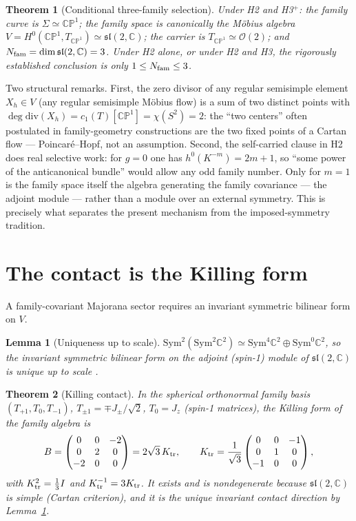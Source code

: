 \documentclass[
  aps,prd,superscriptaddress,nofootinbib,preprint
]{revtex4-2}
\newtheorem{theorem}{Theorem}
\newtheorem{lemma}{Lemma}
\theoremstyle{remark}
\newcommand{\CP}{\mathbb{CP}}
\newcommand{\cO}{\mathcal{O}}
\newcommand{\sltwo}{\mathfrak{sl}(2,\mathbb C)}
\newcommand{\Ktr}{K_{\rm tr}}
\begin{document}
\begin{theorem}[Conditional three-family selection]
\label{thm:threefam}
Under H2 and H3$^+$: the family curve is $\Sigma\simeq\CP^1$; the
family space is canonically the M\"obius algebra
$V=H^0(\CP^1,T_{\CP^1})\simeq\sltwo$; the carrier is
$T_{\CP^1}\simeq\cO(2)$; and $N_{\rm fam}=\dim\sltwo=3$.
Under H2 alone, or under H2 and H3, the rigorously established conclusion
is only $1\le N_{\rm fam}\le3$.
\end{theorem}

Two structural remarks.  First, the zero divisor of any regular
semisimple element $X_h\in V$ (any regular semisimple M\"obius flow) is a sum of two
distinct points with
$\deg\mathrm{div}(X_h)=c_1(T)[\CP^1]=\chi(S^2)=2$: the ``two centers''
often postulated in family-geometry constructions are the two fixed
points of a Cartan flow --- Poincar\'e--Hopf, not an assumption.
Second, the self-carried clause in H2 does real selective work: for
$g=0$ one has $h^0(K^{-m})=2m+1$, so ``some power of the anticanonical
bundle'' would allow any odd family number.  Only for $m=1$ is the
family space itself the algebra generating the family covariance ---
the adjoint module --- rather than a module over an external symmetry.
This is precisely what separates the present mechanism from the
imposed-symmetry tradition.

\section{The contact is the Killing form}
\label{sec:killing}

A family-covariant Majorana sector requires an invariant symmetric
bilinear form on $V$.

\begin{lemma}[Uniqueness up to scale]
\label{lem:unique}
$\mathrm{Sym}^2(\mathrm{Sym}^2\mathbb C^2)\simeq
\mathrm{Sym}^4\mathbb C^2\oplus\mathrm{Sym}^0\mathbb C^2$, so the
invariant symmetric bilinear form on the adjoint (spin-1) module of
$\sltwo$ is unique up to scale \cite{FultonHarris1991}.
\end{lemma}

\begin{theorem}[Killing contact]
\label{thm:killing}
In the spherical orthonormal family basis $(T_{+1},T_0,T_{-1})$,
$T_{\pm1}=\mp J_\pm/\sqrt2$, $T_0=J_z$ (spin-1 matrices), the Killing
form of the family algebra is
\[
  B=\begin{pmatrix}0&0&-2\\0&2&0\\-2&0&0\end{pmatrix}
  =2\sqrt3\,\Ktr,\qquad
  \Ktr=\frac1{\sqrt3}
  \begin{pmatrix}0&0&-1\\0&1&0\\-1&0&0\end{pmatrix},
\]
with $\Ktr^2=\tfrac13 I$ and $\Ktr^{-1}=3\Ktr$.  It exists and is
nondegenerate because $\sltwo$ is simple (Cartan criterion), and it is
the unique invariant contact direction by Lemma~\ref{lem:unique}.
\end{theorem}
\end{document}

